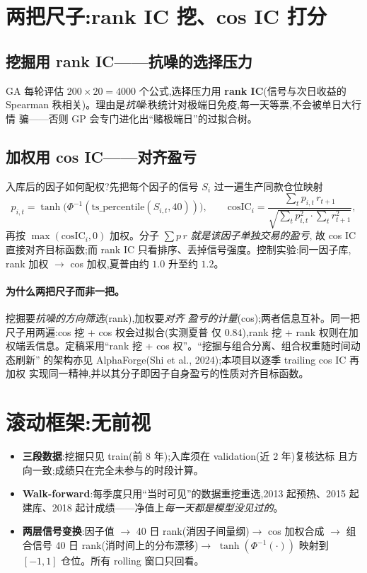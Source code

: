 \documentclass[11pt,a4paper,fontset=mac]{ctexart}
\begin{document}
\section{两把尺子:rank IC 挖、cos IC 打分}
\subsection{挖掘用 rank IC——抗噪的选择压力}
GA 每轮评估 $200\times20=4000$ 个公式,选择压力用 \textbf{rank IC}(信号与次日收益的
Spearman 秩相关)。理由是\emph{抗噪}:秩统计对极端日免疫,每一天等票,不会被单日大行情
骗——否则 GP 会专门进化出``赌极端日''的过拟合树。

\subsection{加权用 cos IC——对齐盈亏}
入库后的因子如何配权?先把每个因子的信号 $S_i$ 过一遍生产同款仓位映射
\begin{equation}
p_{i,t}=\tanh\!\big(\Phi^{-1}(\mathrm{ts\_percentile}(S_{i,t},40))\big),\qquad
\mathrm{cosIC}_i=\frac{\sum_t p_{i,t}\,r_{t+1}}{\sqrt{\sum_t p_{i,t}^2\cdot\sum_t r_{t+1}^2}} ,
\end{equation}
再按 $\max(\mathrm{cosIC}_i,0)$ 加权。分子 $\sum p\,r$ \emph{就是该因子单独交易的盈亏},
故 cos IC 直接对齐目标函数;而 rank IC 只看排序、丢掉信号强度。控制实验:同一因子库,
rank 加权 $\to$ cos 加权,夏普由约 $1.0$ 升至约 $1.2$。

\paragraph{为什么两把尺子而非一把。}挖掘要\emph{抗噪的方向筛选}(rank),加权要\emph{对齐
盈亏的计量}(cos);两者信息互补。同一把尺子用两遍:cos 挖 + cos 权会过拟合(实测夏普
仅 $0.84$),rank 挖 + rank 权则在加权端丢信息。定稿采用``rank 挖 + cos 权''。``挖掘与组合分离、组合权重随时间动态刷新''
的架构亦见 AlphaForge(Shi et al., 2024);本项目以逐季 trailing cos IC 再加权
实现同一精神,并以其分子即因子自身盈亏的性质对齐目标函数。

\section{滚动框架:无前视}
\begin{itemize}
\item \textbf{三段数据}:挖掘只见 train(前 8 年);入库须在 validation(近 2 年)复核达标
且方向一致;成绩只在完全未参与的时段计算。
\item \textbf{Walk-forward}:每季度只用``当时可见''的数据重挖重选,2013 起预热、2015 起
建库、2018 起计成绩——净值上\emph{每一天都是模型没见过的}。
\item \textbf{两层信号变换}:因子值 $\to$ 40 日 rank(消因子间量纲)$\to$ cos 加权合成
$\to$ 组合信号 40 日 rank(消时间上的分布漂移)$\to$ $\tanh(\Phi^{-1}(\cdot))$ 映射到
$[-1,1]$ 仓位。所有 rolling 窗口只回看。
\end{itemize}
\end{document}
